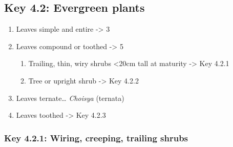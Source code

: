 \documentclass[openany]{book}
\providecommand{\tightlist}{%
  \setlength{\itemsep}{0pt}\setlength{\parskip}{0pt}}
\begin{document}
\hypertarget{key-4.2-evergreen-plants-1}{%
\subsection{Key 4.2: Evergreen
plants}\label{key-4.2-evergreen-plants-1}}

\begin{enumerate}
\def\labelenumi{\arabic{enumi}.}
\tightlist
\item
  Leaves simple and entire -\textgreater{} 3
\item
  Leaves compound or toothed -\textgreater{} 5

  \begin{enumerate}
  \def\labelenumii{\arabic{enumii}.}
  \setcounter{enumii}{2}
  \tightlist
  \item
    Trailing, thin, wiry shrubs \textless{}20cm tall at maturity
    -\textgreater{} Key 4.2.1
  \item
    Tree or upright shrub -\textgreater{} Key 4.2.2
  \end{enumerate}
\item
  Leaves ternate\ldots{} \emph{Choisya} (ternata)
\item
  Leaves toothed -\textgreater{} Key 4.2.3
\end{enumerate}

\hypertarget{key-4.2.1-wiring-creeping-trailing-shrubs-1}{%
\subsubsection{Key 4.2.1: Wiring, creeping, trailing
shrubs}\label{key-4.2.1-wiring-creeping-trailing-shrubs-1}}
\end{document}

